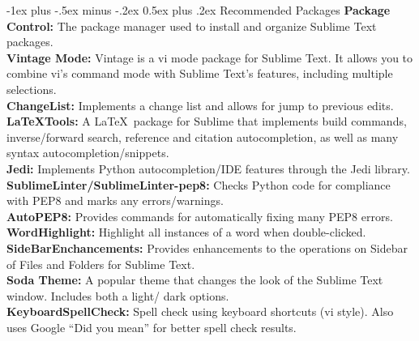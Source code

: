 \documentclass[10pt,landscape]{article}
\makeatletter
\newcommand{\nl}{\\[.3ex]}
\newcommand{\hid}{\hangindent=0.3cm}
\renewcommand{\section}{\@startsection{section}{1}{0mm}%
                                {-1ex plus -.5ex minus -.2ex}%
                                {0.5ex plus .2ex}%
                                {\normalfont\large\bfseries}}
\makeatother
\begin{document}
\begin{multicols*}{3}
\section{Recommended Packages}
\hid
{\bf Package Control:} The package manager used to 
install and organize Sublime Text packages. \nl
\hid
{\bf Vintage Mode:} Vintage is a vi mode package for Sublime Text. It allows 
you to combine vi's command mode with Sublime Text's features, including multiple selections.\nl
\hid
{\bf ChangeList:} Implements a change list and allows for jump to previous edits. \nl
\hid
{\bf LaTeXTools:} A \LaTeX\ package for Sublime that implements build commands, 
inverse/forward search, reference and citation autocompletion, as well as many syntax 
autocompletion/snippets.\nl
\hid
{\bf Jedi:} 
Implements Python autocompletion/IDE features through the Jedi library. 
\nl
\hid
{\bf SublimeLinter/SublimeLinter-pep8:} 
Checks Python code for compliance with PEP8 and marks any errors/warnings. 
\nl
\hid
{\bf AutoPEP8:} 
Provides commands for automatically fixing many PEP8 errors. 
\nl
\hid
{\bf WordHighlight:} 
Highlight all instances of a word when double-clicked. 
\nl
\hid
{\bf SideBarEnchancements:} 
Provides enhancements to the operations on Sidebar of Files and Folders for Sublime Text.
\nl
\hid
{\bf Soda Theme:} 
A popular theme that changes the look of the Sublime Text window. Includes both a light/
dark options. 
\nl
\hid
{\bf KeyboardSpellCheck:} Spell check using keyboard shortcuts (vi style). Also uses Google 
``Did you mean'' for better spell check results.


\end{multicols*}
\end{document}
